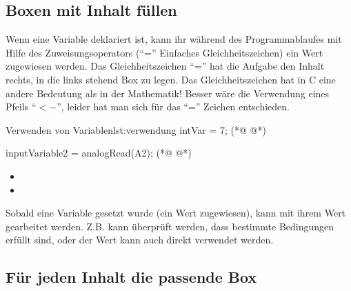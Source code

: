 
\subsection{Boxen mit Inhalt füllen}

Wenn eine Variable deklariert ist, kann ihr während des Programmablaufes mit Hilfe des Zuweisungsoperators 
(``='' Einfaches Gleichheitszeichen) ein Wert zugewiesen werden. Das Gleichheitszeichen ``='' hat die Aufgabe den Inhalt rechts, in die links stehend Box zu legen. Das Gleichheitszeichen hat in C eine andere Bedeutung als in der Mathematik! Besser wäre die Verwendung eines Pfeils ``$<-$'', leider hat man sich für das ``='' Zeichen entschieden.    
\clearpage

\begin{multicols}{2}
\null\vfill 
\begin{arduinoCode}{Verwenden von Variablen}{lst:verwendung}
 intVar = 7;  (*@  @*) 
 
 inputVariable2 = analogRead(A2); (*@  @*) 
\end{arduinoCode}
\vfill\null 
\columnbreak

\null\vfill
\begin{itemize}
  \itemsep25pt
  \item[] 
  \item[]  
\end{itemize}
\vfill \null


\end{multicols}


Sobald eine Variable gesetzt wurde (ein Wert zugewiesen), kann mit ihrem Wert gearbeitet 
werden. Z.B. kann überprüft werden, dass bestimmte Bedingungen erfüllt sind, oder der Wert
kann auch direkt  verwendet werden. 

\subsection{Für jeden Inhalt die passende Box}

